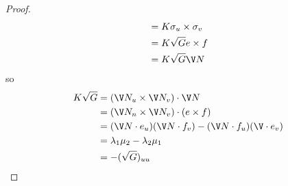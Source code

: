 \documentclass[a4paper]{article}
\theoremstyle{definition}
\begin{document}
\begin{proof}
\begin{align*}
    &= K \sigma_u \times \sigma_v \\
    &= K \sqrt G e \times f \\
    &= K \sqrt G \V N
  \end{align*}
  so
  \begin{align*}
    K \sqrt G
    &= (\V N_u \times \V N_v) \cdot \V N \\
    &= (\V N_n \times \V N_v) \cdot (e \times f) \\
    &= (\V N \cdot e_u) (\V N \cdot f_v) - (\V N \cdot f_u) (\V \cdot e_v) \\
    &= \lambda_1 \mu_2 - \lambda_2 \mu_1 \\
    &= - (\sqrt G)_{uu}
  \end{align*}
\end{proof}









\printindex

\iffalse
Other courses that might be useful: topology, part of analysis II (differentiability in R^n and inverse function theorem)

Leads to: IID Differential Geometry

Reading List

P.\ Wilson, Curverd Spaces, CUP 2008
From classical geometries to elementary differential geometry
\fi
\end{document}
